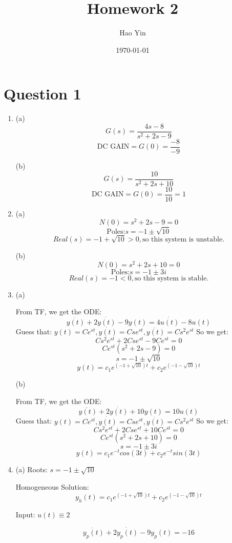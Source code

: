 \documentclass[12pt]{article}
\begin{document}
\title{Homework 2}
\author{Hao Yin}
\date{\today}
\maketitle

\section*{Question 1}
\begin{enumerate}[label=\roman*.]
    \item (a)
    \[G(s) = \frac{4s-8}{s^2+2s-9}\]
    \[\text{DC GAIN} = G(0) = \frac{-8}{-9}\]

    (b)
    \[G(s) = \frac{10}{s^2+2s+10}\]
    \[\text{DC GAIN} = G(0) = \frac{10}{10} = 1\]

    \item (a)
    \[N(0) = s^2+2s-9 = 0\]
    \[\text{Poles:} s = -1 \pm \sqrt{10}\]
    \[Real(s) = -1 + \sqrt{10} > 0, \text{so this system is unstable.}\]

    (b)
    \[N(0) = s^2+2s+10 = 0\]
    \[\text{Poles:} s = -1 \pm 3i\]
    \[Real(s) = -1 < 0, \text{so this system is stable.}\]

    \item (a)
    
    From TF, we get the ODE:
    \[\ddot{y(t)} + 2\dot{y(t)} - 9y(t) = 4\dot{u(t)} - 8u(t)\]
    Guess that: $y(t) = Ce^{st}, \dot{y(t)} = Cse^{st}, 
        \ddot{y(t)} = Cs^2e^{st}$
    So we get:
    \[Cs^2e^{st} + 2Cse^{st} - 9Ce^{st} = 0\]
    \[Ce^{st} (s^2 + 2s - 9) = 0\]
    \[s = -1 \pm \sqrt{10}\]
    \[y(t) = c_1e^{(-1+\sqrt{10})t} + c_2e^{(-1-\sqrt{10})t}\]

    (b)

    From TF, we get the ODE:
    \[\ddot{y(t)} + 2\dot{y(t)} + 10y(t) = 10u(t)\]
    Guess that: $y(t) = Ce^{st}, \dot{y(t)} = Cse^{st}, 
        \ddot{y(t)} = Cs^2e^{st}$
    So we get:
    \[Cs^2e^{st} + 2Cse^{st} + 10Ce^{st} = 0\]
    \[Ce^{st} (s^2 + 2s + 10) = 0\]
    \[s = -1 \pm 3i\]
    \[y(t) = c_1e^{-t}cos(3t) + c_2e^{-t}sin(3t)\]

    \item (a)
    Roots: $s = -1 \pm \sqrt{10}$

    Homogeneous Solution: 
    \[y_h(t) = c_1e^{(-1+\sqrt{10})t} + c_2e^{(-1-\sqrt{10})t}\]

    Input: $u(t) \equiv 2$

    \[\ddot{y_p(t)} + 2\dot{y_p(t)} - 9y_p(t) = -16\]


\end{enumerate}
\end{document}
